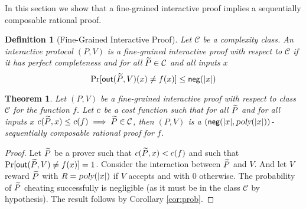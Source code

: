 
\newtheorem*{theorem*}{Theorem}
\newtheorem*{definition*}{Definition}

In this section we show that a fine-grained interactive proof implies a sequentially composable rational proof.

\def\sndCls{\mathcal{C}}

\begin{definition*}[Fine-Grained Interactive Proof]
Let $\sndCls$ be a complexity class. An interactive protocol $(P, V)$ is a fine-grained interactive proof with respect to $\sndCls$ if it has perfect completeness and for all $\disP \in \sndCls$ and all inputs $x$
$$ \Pr[\mathsf{out}(\widetilde{P},V)(x) \not = f(x)] \leq  \mathsf{neg}(|x|)$$
\end{definition*}

\begin{theorem*}
Let $(P, V)$ be a fine-grained interactive proof with respect to class $\sndCls$ for the function $f$. Let $c$ be a cost function such that for all $\widetilde{P}$ and for all inputs $x$ $\cost(\disP, x) \leq \cost(f) \implies \disP \in \sndCls$, then $(P, V)$ is a $(\mathsf{neg}(|x|, {\textsl{poly}}(|x|))$-sequentially composable rational proof for $f$.
\end{theorem*}
\begin{proof}
	Let $\widetilde{P}$ be a prover such that $c(\widetilde{P}, x) < c(f)$ and such that $\Pr[\mathsf{out}(\widetilde{P}, V) \not = f(x)] = 1$. Consider the interaction between $\widetilde{P}$ and $V$. And let $V$ reward $\widetilde{P}$ with $R = {\textsl{poly}}(|x|)$ if $V$ accepts and with $0$ otherwise.
	The probability of $\widetilde{P}$ cheating successfully is negligible (as it must be in the class $\sndCls$ by hypothesis).  The result follows by Corollary \ref{cor:prob}.
\end{proof}
